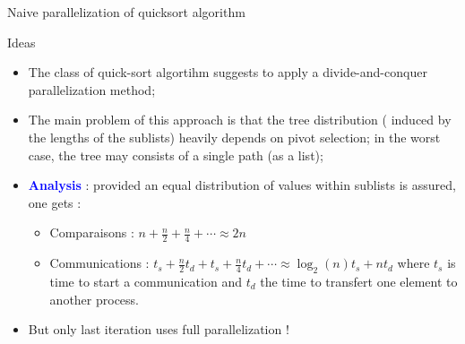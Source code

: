 \documentclass[compress,10pt,aspectratio=169]{beamer}
\begin{document}
\begin{frame}[fragile]{Naive parallelization of quicksort algorithm}
    \scriptsize
    \begin{block}{Ideas}
        \begin{itemize}
            \item The class of quick-sort algortihm suggests to apply a divide-and-conquer parallelization method;
            \item The main problem of this approach is that the tree distribution ( induced by the lengths of the sublists)
                  heavily depends on pivot selection; in the worst case, the tree may consists of a single path (as a list);
            \item \textcolor{blue}{\bf Analysis} : provided an equal distribution of values within sublists is assured, one gets :
            \begin{itemize}
                \item {\scriptsize Comparaisons : $\displaystyle n + \frac{n}{2} + \frac{n}{4} + \cdots \approx 2n$}
                \item {\scriptsize Communications : $t_{s} + \frac{n}{2}t_{d} + t_{s} + \frac{n}{4}t_{d} + \cdots \approx \log_{2}(n)t_{s} + nt_{d}$ where $t_{s}$ is time to start a communication
                      and $t_{d}$ the time to transfert one element to another process.}
            \end{itemize}
            \item But only last iteration uses full parallelization !
        \end{itemize}
    \end{block}
\end{frame}
\end{document}
